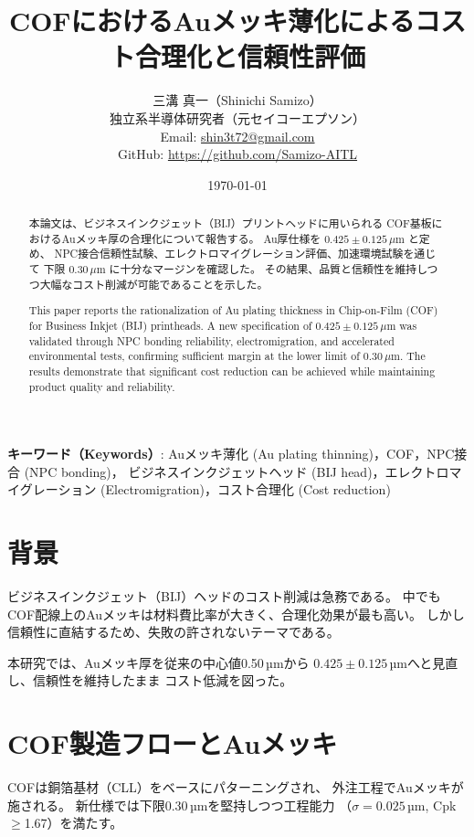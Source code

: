 \documentclass[a4paper,12pt]{jsarticle}
\title{COFにおけるAuメッキ薄化によるコスト合理化と信頼性評価}
\author{三溝 真一（Shinichi Samizo）\\
独立系半導体研究者（元セイコーエプソン）\\
Email: \href{mailto:shin3t72@gmail.com}{shin3t72@gmail.com}\\
GitHub: \url{https://github.com/Samizo-AITL}}
\date{\today}
\begin{document}
\maketitle

\begin{abstract}
本論文は、ビジネスインクジェット（BIJ）プリントヘッドに用いられる
COF基板におけるAuメッキ厚の合理化について報告する。
Au厚仕様を $0.425 \pm 0.125\,\mu$m と定め、
NPC接合信頼性試験、エレクトロマイグレーション評価、加速環境試験を通じて
下限 $0.30\,\mu$m に十分なマージンを確認した。
その結果、品質と信頼性を維持しつつ大幅なコスト削減が可能であることを示した。
\end{abstract}

\begin{abstract}
This paper reports the rationalization of Au plating thickness
in Chip-on-Film (COF) for Business Inkjet (BIJ) printheads.
A new specification of $0.425 \pm 0.125\,\mu$m was validated
through NPC bonding reliability, electromigration, and accelerated
environmental tests, confirming sufficient margin at the lower limit
of $0.30\,\mu$m. The results demonstrate that significant cost reduction
can be achieved while maintaining product quality and reliability.
\end{abstract}

\textbf{キーワード（Keywords）}: Auメッキ薄化 (Au plating thinning)，COF，NPC接合 (NPC bonding)，
ビジネスインクジェットヘッド (BIJ head)，エレクトロマイグレーション (Electromigration)，コスト合理化 (Cost reduction)

\section{背景}
ビジネスインクジェット（BIJ）ヘッドのコスト削減は急務である。
中でもCOF配線上のAuメッキは材料費比率が大きく、合理化効果が最も高い。
しかし信頼性に直結するため、失敗の許されないテーマである。

本研究では、Auメッキ厚を従来の中心値0.50\,µmから
$0.425 \pm 0.125$\,µmへと見直し、信頼性を維持したまま
コスト低減を図った。

\section{COF製造フローとAuメッキ}
COFは銅箔基材（CLL）をベースにパターニングされ、
外注工程でAuメッキが施される。
新仕様では下限0.30\,µmを堅持しつつ工程能力
（$\sigma=0.025$\,µm, Cpk$\geq$1.67）を満たす。
\end{document}
